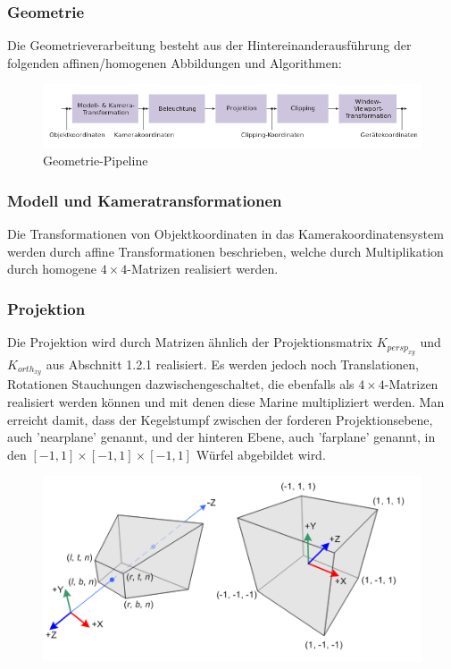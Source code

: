 \subsubsection{Geometrie}
Die Geometrieverarbeitung   besteht aus der Hintereinanderausführung der folgenden affinen/homogenen Abbildungen und Algorithmen:
\begin{figure}[H]
    \centering
    \includegraphics[width=1.0\textwidth]{images/cgpipeline.png}
    \caption{Geometrie-Pipeline}
    \label{fig:gimbal+lock}
\end{figure}

\subsubsection*{Modell und Kameratransformationen}
Die Transformationen von Objektkoordinaten in das Kamerakoordinatensystem werden durch affine Transformationen beschrieben, welche durch Multiplikation durch homogene $4 \times 4$-Matrizen realisiert werden. 

\subsubsection*{Projektion}
Die Projektion  wird durch  Matrizen  ähnlich der Projektionsmatrix $K_{persp_{xy}}$ und   $K_{orth_{xy}}$ aus Abschnitt 1.2.1 realisiert.
Es werden jedoch noch  Translationen, Rotationen Stauchungen dazwischengeschaltet, die ebenfalls als $4 \times 4$-Matrizen realisiert werden können und mit denen diese Marine multipliziert werden.  Man erreicht damit, dass der Kegelstumpf zwischen der forderen Projektionsebene, auch 'nearplane' genannt,  und der hinteren Ebene, auch 'farplane' genannt, in den $[-1,1] \times [-1,1] \times [-1,1] $ Würfel abgebildet wird.   
\begin{figure}[H]
    \centering
    \includegraphics[width=1.0\textwidth]{images/gl_projectionmatrix01.png}
\end{figure}


